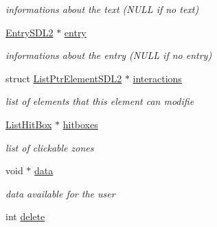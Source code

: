 \begin{DoxyCompactItemize}
\begin{DoxyCompactList}\small\item\em informations about the text (N\+U\+LL if no text) \end{DoxyCompactList}\item 
\hyperlink{structEntrySDL2}{Entry\+S\+D\+L2} $\ast$ \hyperlink{structElementSDL2_a9c99c1c34dcf0e52baaca7a64598bd8a}{entry}\hypertarget{structElementSDL2_a9c99c1c34dcf0e52baaca7a64598bd8a}{}\label{structElementSDL2_a9c99c1c34dcf0e52baaca7a64598bd8a}

\begin{DoxyCompactList}\small\item\em informations about the entry (N\+U\+LL if no entry) \end{DoxyCompactList}\item 
struct \hyperlink{structListPtrElementSDL2}{List\+Ptr\+Element\+S\+D\+L2} $\ast$ \hyperlink{structElementSDL2_aca39f22199862196fc52dfcecafeca4a}{interactions}\hypertarget{structElementSDL2_aca39f22199862196fc52dfcecafeca4a}{}\label{structElementSDL2_aca39f22199862196fc52dfcecafeca4a}

\begin{DoxyCompactList}\small\item\em list of elements that this element can modifie \end{DoxyCompactList}\item 
\hyperlink{structListHitBox}{List\+Hit\+Box} $\ast$ \hyperlink{structElementSDL2_aa4af7ab8949d93544da609659a4011c0}{hitboxes}\hypertarget{structElementSDL2_aa4af7ab8949d93544da609659a4011c0}{}\label{structElementSDL2_aa4af7ab8949d93544da609659a4011c0}

\begin{DoxyCompactList}\small\item\em list of clickable zones \end{DoxyCompactList}\item 
void $\ast$ \hyperlink{structElementSDL2_abca7de78cc7e420d98d24a955563c7cc}{data}\hypertarget{structElementSDL2_abca7de78cc7e420d98d24a955563c7cc}{}\label{structElementSDL2_abca7de78cc7e420d98d24a955563c7cc}

\begin{DoxyCompactList}\small\item\em data available for the user \end{DoxyCompactList}\item 
int \hyperlink{structElementSDL2_a59d6b7086533d8d7da883bc882c4ef6d}{delete}\hypertarget{structElementSDL2_a59d6b7086533d8d7da883bc882c4ef6d}{}\label{structElementSDL2_a59d6b7086533d8d7da883bc882c4ef6d}


\end{DoxyCompactItemize}
